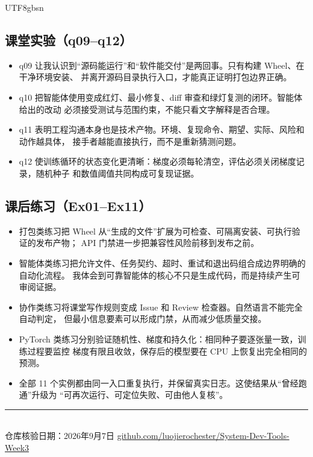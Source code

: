 \documentclass[11pt]{article}
\newcommand{\ReportDate}{2026年9月7日}
\newcommand{\RepositoryURL}{https://github.com/luojierochester/System-Dev-Tools-Week3}
\begin{document}
\begin{CJK*}{UTF8}{gbsn}
\subsection{课堂实验（q09--q12）}
\begin{itemize}
  \item q09 让我认识到“源码能运行”和“软件能交付”是两回事。只有构建 Wheel、在干净环境安装、
        并离开源码目录执行入口，才能真正证明打包边界正确。
  \item q10 把智能体使用变成红灯、最小修复、diff 审查和绿灯复测的闭环。智能体给出的改动
        必须接受测试与范围约束，不能只看文字解释是否合理。
  \item q11 表明工程沟通本身也是技术产物。环境、复现命令、期望、实际、风险和动作越具体，
        接手者越能直接执行，而不是重新猜测问题。
  \item q12 使训练循环的状态变化更清晰：梯度必须每轮清空，评估必须关闭梯度记录，随机种子
        和数值阈值共同构成可复现证据。
\end{itemize}

\subsection{课后练习（Ex01--Ex11）}
\begin{itemize}
  \item 打包类练习把 Wheel 从“生成的文件”扩展为可检查、可隔离安装、可执行验证的发布产物；
        API 门禁进一步把兼容性风险前移到发布之前。
  \item 智能体类练习把允许文件、任务契约、超时、重试和退出码组合成边界明确的自动化流程。
        我体会到可靠智能体的核心不只是生成代码，而是持续产生可审阅证据。
  \item 协作类练习将课堂写作规则变成 Issue 和 Review 检查器。自然语言不能完全自动判定，
        但最小信息要素可以形成门禁，从而减少低质量交接。
  \item PyTorch 类练习分别验证随机性、梯度和持久化：相同种子要逐张量一致，训练过程要监控
        梯度有限且收敛，保存后的模型要在 CPU 上恢复出完全相同的预测。
  \item 全部 11 个实例都由同一入口重复执行，并保留真实日志。这使结果从“曾经跑通”升级为
        “可再次运行、可定位失败、可由他人复核”。
\end{itemize}

\vfill
\begin{center}
  {\color{AccentBlue}\rule{0.34\linewidth}{0.8pt}}\\[1.2em]
  {\small\sffamily\color{SlateGray}
  仓库核验日期：\ReportDate\quad\textbullet\quad
  \href{\RepositoryURL}{github.com/luojierochester/System-Dev-Tools-Week3}}
\end{center}

\clearpage
\ifPDFTeX\end{CJK*}\fi
\end{document}
